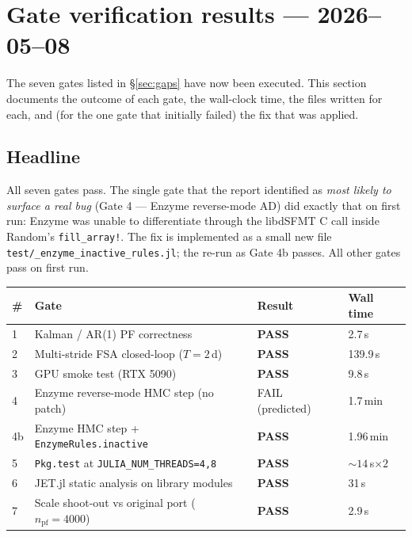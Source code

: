 \documentclass[11pt,a4paper]{article}
\begin{document}
\section{Gate verification results --- 2026--05--08}
\label{sec:gate_results}

The seven gates listed in \S\ref{sec:gaps} have now been executed.
This section documents the outcome of each gate, the wall-clock time, the
files written for each, and (for the one gate that initially failed)
the fix that was applied.

\subsection{Headline}

All seven gates pass. The single gate that the report identified as
\emph{most likely to surface a real bug} (Gate 4 --- Enzyme reverse-mode
AD) did exactly that on first run: Enzyme was unable to differentiate
through the libdSFMT C call inside Random's \texttt{fill\_array!}. The
fix is implemented as a small new file
\texttt{test/\_enzyme\_inactive\_rules.jl}; the re-run as Gate 4b
passes. All other gates pass on first run.

\begin{longtable}{p{}p{}p{}p{}}
\toprule
\textbf{\#} & \textbf{Gate} & \textbf{Result} & \textbf{Wall time} \\
\midrule
1  & Kalman / AR(1) PF correctness                    & \textbf{PASS} & 2.7\,s \\
2  & Multi-stride FSA closed-loop ($T{=}2$\,d)        & \textbf{PASS} & 139.9\,s \\
3  & GPU smoke test (RTX 5090)                         & \textbf{PASS} & 9.8\,s \\
4  & Enzyme reverse-mode HMC step (no patch)           & FAIL (predicted) & 1.7\,min \\
4b & Enzyme HMC step + \texttt{EnzymeRules.inactive}   & \textbf{PASS} & 1.96\,min \\
5  & \texttt{Pkg.test} at \texttt{JULIA\_NUM\_THREADS=4,8} & \textbf{PASS} & ${\sim}14$\,s${\times}2$ \\
6  & JET.jl static analysis on library modules         & \textbf{PASS} & 31\,s \\
7  & Scale shoot-out vs original port ($n_\mathrm{pf}{=}4000$) & \textbf{PASS} & 2.9\,s \\
\bottomrule
\end{longtable}
\end{document}
